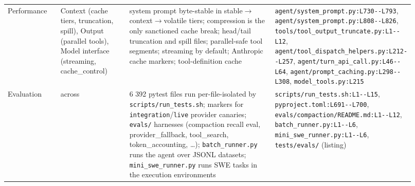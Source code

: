 \begin{longtable}{@{}p{0.13\linewidth}p{0.17\linewidth}p{0.36\linewidth}p{0.26\linewidth}@{}}
Performance & Context (cache tiers, truncation, spill), Output (parallel tools), Model interface (streaming, cache\_control) & system prompt byte-stable in stable$\rightarrow$context$\rightarrow$volatile tiers; compression is the only sanctioned cache break; head/tail truncation and spill files; parallel-safe tool segments; streaming by default; Anthropic cache markers; tool-definition cache & \texttt{agent/\allowbreak{}system\_\allowbreak{}prompt.\allowbreak{}py:\allowbreak{}L730-\allowbreak{}-\allowbreak{}L793}, \texttt{agent/\allowbreak{}system\_\allowbreak{}prompt.\allowbreak{}py:\allowbreak{}L808-\allowbreak{}-\allowbreak{}L826}, \texttt{tools/\allowbreak{}tool\_\allowbreak{}output\_\allowbreak{}truncate.\allowbreak{}py:\allowbreak{}L1-\allowbreak{}-\allowbreak{}L12}, \texttt{agent/\allowbreak{}tool\_\allowbreak{}dispatch\_\allowbreak{}helpers.\allowbreak{}py:\allowbreak{}L212-\allowbreak{}-\allowbreak{}L257}, \texttt{agent/\allowbreak{}turn\_\allowbreak{}api\_\allowbreak{}call.\allowbreak{}py:\allowbreak{}L46-\allowbreak{}-\allowbreak{}L64}, \texttt{agent/\allowbreak{}prompt\_\allowbreak{}caching.\allowbreak{}py:\allowbreak{}L298-\allowbreak{}-\allowbreak{}L308}, \texttt{model\_\allowbreak{}tools.\allowbreak{}py:\allowbreak{}L215} \\
Evaluation & across & 6 392 pytest files run per-file-isolated by \texttt{scripts/\allowbreak{}run\_\allowbreak{}tests.\allowbreak{}sh}; markers for \texttt{integration}/\texttt{live} provider canaries; \texttt{evals/\allowbreak{}} harnesses (compaction recall eval, provider\_fallback, tool\_search, token\_accounting, \ldots{}); \texttt{batch\_\allowbreak{}runner.\allowbreak{}py} runs the agent over JSONL datasets; \texttt{mini\_\allowbreak{}swe\_\allowbreak{}runner.\allowbreak{}py} runs SWE tasks in the execution environments & \texttt{scripts/\allowbreak{}run\_\allowbreak{}tests.\allowbreak{}sh:\allowbreak{}L1-\allowbreak{}-\allowbreak{}L15}, \texttt{pyproject.\allowbreak{}toml:\allowbreak{}L691-\allowbreak{}-\allowbreak{}L700}, \texttt{evals/\allowbreak{}compaction/\allowbreak{}README.\allowbreak{}md:\allowbreak{}L1-\allowbreak{}-\allowbreak{}L12}, \texttt{batch\_\allowbreak{}runner.\allowbreak{}py:\allowbreak{}L1-\allowbreak{}-\allowbreak{}L6}, \texttt{mini\_\allowbreak{}swe\_\allowbreak{}runner.\allowbreak{}py:\allowbreak{}L1-\allowbreak{}-\allowbreak{}L6}, \texttt{tests/\allowbreak{}evals/\allowbreak{}} (listing) \\
\bottomrule \end{longtable}

